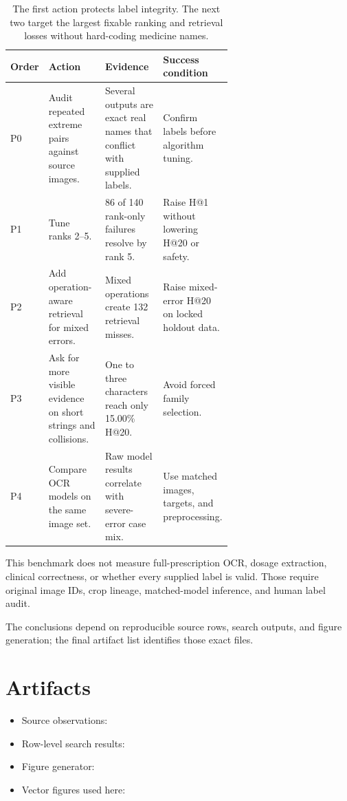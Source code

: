 \documentclass[11pt]{article}
\begin{document}
\begin{table}[htbp]
\centering
\small
\begin{tabularx}{\linewidth}{@{}p{0.08\linewidth}p{0.27\linewidth}p{0.29\linewidth}Y@{}}
\toprule
\textbf{Order} & \textbf{Action} & \textbf{Evidence} & \textbf{Success condition} \\
\midrule
P0 & Audit repeated extreme pairs against source images. & Several outputs are exact real names that conflict with supplied labels. & Confirm labels before algorithm tuning. \\
P1 & Tune ranks 2--5. & 86 of 140 rank-only failures resolve by rank 5. & Raise H@1 without lowering H@20 or safety. \\
P2 & Add operation-aware retrieval for mixed errors. & Mixed operations create 132 retrieval misses. & Raise mixed-error H@20 on locked holdout data. \\
P3 & Ask for more visible evidence on short strings and collisions. & One to three characters reach only 15.00\% H@20. & Avoid forced family selection. \\
P4 & Compare OCR models on the same image set. & Raw model results correlate with severe-error case mix. & Use matched images, targets, and preprocessing. \\
\bottomrule
\end{tabularx}
\caption{The first action protects label integrity. The next two target the
largest fixable ranking and retrieval losses without hard-coding medicine names.}
\label{tab:actions}
\end{table}

\FloatBarrier

This benchmark does not measure full-prescription OCR, dosage extraction,
clinical correctness, or whether every supplied label is valid. Those require
original image IDs, crop lineage, matched-model inference, and human label audit.

The conclusions depend on reproducible source rows, search outputs, and figure
generation; the final artifact list identifies those exact files.

\section{Artifacts}

\begin{itemize}
  \item Source observations: 
  \item Row-level search results: 
  \item Figure generator: 
  \item Vector figures used here: 
\end{itemize}
\end{document}
